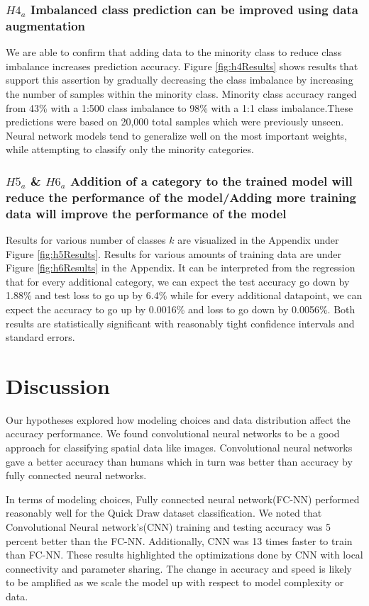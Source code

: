 \documentclass[11pt]{article}
\begin{document}
\subsubsection{$H4_a$\: Imbalanced class prediction can be improved using
  data augmentation}

We are able to confirm that adding data to the minority class to reduce
class imbalance increases prediction accuracy. Figure \ref{fig:h4Results}
shows results that support this assertion by gradually decreasing the class
imbalance by increasing the number of samples within the minority class.
Minority class accuracy ranged from 43\% with a 1:500 class imbalance to
98\% with a 1:1 class imbalance.These predictions were based on 20,000 total
samples which were previously unseen. Neural network models tend to
generalize well on the most important weights, while attempting to classify
only the minority categories.

\subsubsection{$H5_a$ \& $H6_a$\: Addition of a category to the trained model
  will reduce the performance of the model/Adding more training data will
  improve the performance of the model}

Results for various number of classes $k$ are visualized in the Appendix
under Figure \ref{fig:h5Results}. Results for various amounts of training
data are under Figure \ref{fig:h6Results} in the Appendix. It can be
interpreted from the regression that for every additional category,
we can expect the test accuracy go down by 1.88\% and test loss to go up by
6.4\% while for every additional datapoint, we can expect the accuracy to go
up by 0.0016\% and loss to go down by 0.0056\%. Both results are statistically
significant with reasonably tight confidence intervals and standard errors.

\section{Discussion}

Our hypotheses explored how modeling choices and data distribution affect
the accuracy performance. We found convolutional neural networks to be a
good approach for classifying spatial data like images. Convolutional neural
networks gave a better accuracy than humans which in turn was better than
accuracy by fully connected neural networks. 

In terms of modeling choices, Fully connected neural network(FC-NN)
performed reasonably well for the Quick Draw dataset classification. We
noted that Convolutional Neural network’s(CNN) training and testing accuracy
was 5 percent better than the FC-NN. Additionally,  CNN was 13 times faster
to train than FC-NN. These results highlighted the optimizations done by
CNN with local connectivity and parameter sharing. The change in accuracy
and speed is likely to be amplified as we scale the model up with respect
to model complexity or data.
\end{document}
